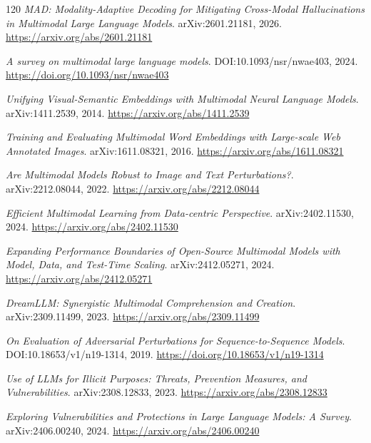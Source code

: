 \documentclass[11pt,a4paper]{article}
\begin{document}
\begin{thebibliography}{120}
\newblock \emph{MAD: Modality-Adaptive Decoding for Mitigating Cross-Modal Hallucinations in Multimodal Large Language Models}.
\newblock arXiv:2601.21181, 2026.
\newblock \url{https://arxiv.org/abs/2601.21181}

\newblock \emph{A survey on multimodal large language models}.
\newblock DOI:10.1093/nsr/nwae403, 2024.
\newblock \url{https://doi.org/10.1093/nsr/nwae403}

\newblock \emph{Unifying Visual-Semantic Embeddings with Multimodal Neural Language Models}.
\newblock arXiv:1411.2539, 2014.
\newblock \url{https://arxiv.org/abs/1411.2539}

\newblock \emph{Training and Evaluating Multimodal Word Embeddings with Large-scale Web Annotated Images}.
\newblock arXiv:1611.08321, 2016.
\newblock \url{https://arxiv.org/abs/1611.08321}

\newblock \emph{Are Multimodal Models Robust to Image and Text Perturbations?}.
\newblock arXiv:2212.08044, 2022.
\newblock \url{https://arxiv.org/abs/2212.08044}

\newblock \emph{Efficient Multimodal Learning from Data-centric Perspective}.
\newblock arXiv:2402.11530, 2024.
\newblock \url{https://arxiv.org/abs/2402.11530}

\newblock \emph{Expanding Performance Boundaries of Open-Source Multimodal Models with Model, Data, and Test-Time Scaling}.
\newblock arXiv:2412.05271, 2024.
\newblock \url{https://arxiv.org/abs/2412.05271}

\newblock \emph{DreamLLM: Synergistic Multimodal Comprehension and Creation}.
\newblock arXiv:2309.11499, 2023.
\newblock \url{https://arxiv.org/abs/2309.11499}

\newblock \emph{On Evaluation of Adversarial Perturbations for Sequence-to-Sequence Models}.
\newblock DOI:10.18653/v1/n19-1314, 2019.
\newblock \url{https://doi.org/10.18653/v1/n19-1314}

\newblock \emph{Use of LLMs for Illicit Purposes: Threats, Prevention Measures, and Vulnerabilities}.
\newblock arXiv:2308.12833, 2023.
\newblock \url{https://arxiv.org/abs/2308.12833}

\newblock \emph{Exploring Vulnerabilities and Protections in Large Language Models: A Survey}.
\newblock arXiv:2406.00240, 2024.
\newblock \url{https://arxiv.org/abs/2406.00240}


\end{thebibliography}
\end{document}
